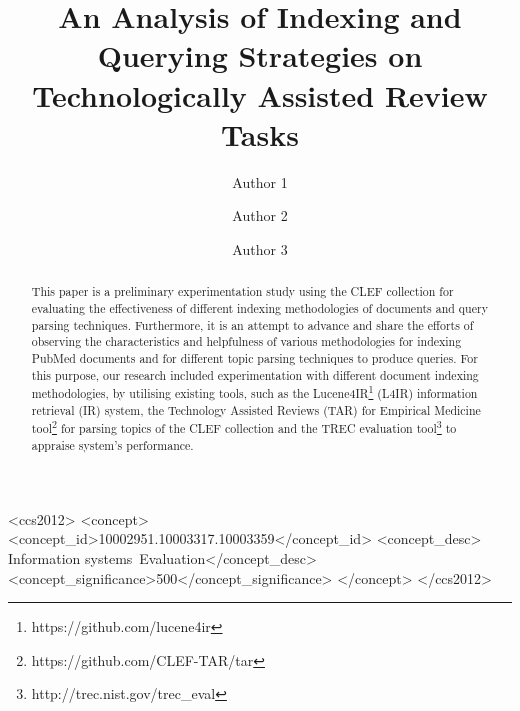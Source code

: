 \documentclass[sigconf]{acmart}
\begin{document}
\title{An Analysis of Indexing and Querying Strategies on Technologically Assisted Review Tasks}


\author{Author 1}

\author{Author 2}

\author{Author 3}

\renewcommand{\shortauthors}{B. Trovato et al.}

\begin{abstract}

This paper is a preliminary experimentation study using the CLEF collection for evaluating the effectiveness of different indexing methodologies of documents and query parsing techniques. Furthermore, it is an attempt to advance and share the efforts of observing the characteristics and helpfulness of various methodologies for indexing PubMed documents and for different topic parsing techniques to produce queries. For this purpose, our research included experimentation with different document indexing methodologies, by utilising existing tools, such as the Lucene4IR\footnote{https://github.com/lucene4ir} (L4IR) information retrieval (IR) system, the Technology Assisted Reviews (TAR) for Empirical Medicine tool\footnote{https://github.com/CLEF-TAR/tar} for parsing topics of the CLEF collection and the TREC evaluation tool\footnote{http://trec.nist.gov/trec\_eval} to appraise system's performance.  

\end{abstract}

%
%
\begin{CCSXML}
<ccs2012>
 <concept>
  <concept_id>10002951.10003317.10003359</concept_id>
  <concept_desc> Information systems~Evaluation</concept_desc>
  <concept_significance>500</concept_significance>
 </concept>
 </ccs2012>  
\end{CCSXML}





\maketitle




 
\end{document}
